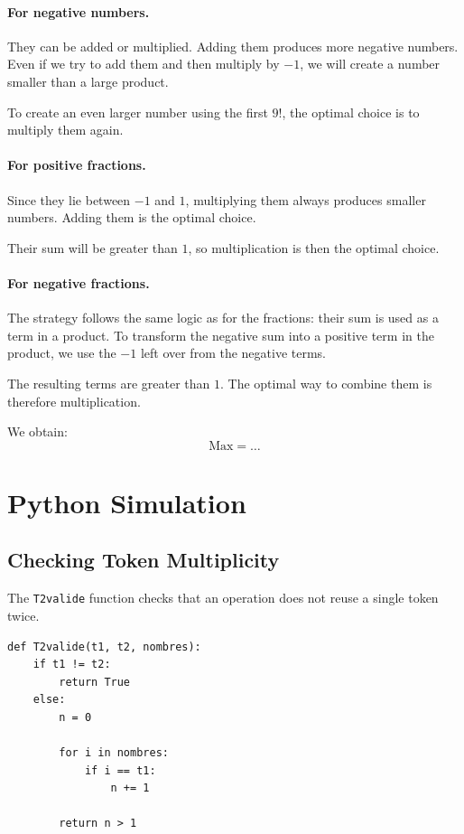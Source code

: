 \documentclass[12pt,a4paper]{article}
\begin{document}
\paragraph{For negative numbers.}
They can be added or multiplied. Adding them produces more negative
numbers. Even if we try to add them and then multiply by $-1$, we
will create a number smaller than a large product.

To create an even larger number using the first $9!$, the optimal
choice is to multiply them again.

\paragraph{For positive fractions.}
Since they lie between $-1$ and $1$, multiplying them always
produces smaller numbers. Adding them is the optimal choice.

Their sum will be greater than $1$, so multiplication is then
the optimal choice.

\paragraph{For negative fractions.}
The strategy follows the same logic as for the fractions: their sum
is used as a term in a product. To transform the negative sum into
a positive term in the product, we use the $-1$ left over from
the negative terms.

The resulting terms are greater than $1$. The optimal way to
combine them is therefore multiplication.

We obtain:
\[
\boxed{\mathrm{Max}=\ldots}
\]

\section{Python Simulation}

\subsection{Checking Token Multiplicity}

The \texttt{T2valide} function checks that an operation does not
reuse a single token twice.

\begin{lstlisting}
def T2valide(t1, t2, nombres):
    if t1 != t2:
        return True
    else:
        n = 0

        for i in nombres:
            if i == t1:
                n += 1

        return n > 1
\end{lstlisting}
\end{document}
